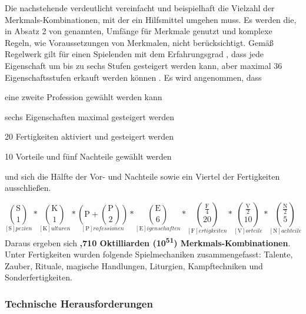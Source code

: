 Die nachstehende  verdeutlicht vereinfacht und beispielhaft die Vielzahl der Merkmals-Kombinationen, mit der ein Hilfsmittel umgehen muss.
Es werden die, in Absatz 2 von  genannten, Umfänge für Merkmale genutzt und komplexe Regeln, wie \zB Voraussetzungen von Merkmalen, nicht berücksichtigt.
Gemäß Regelwerk gilt für einen Spielenden mit dem Erfahrungsgrad , dass jede Eigenschaft um bis zu sechs Stufen gesteigert werden kann, aber maximal 36 Eigenschaftsstufen erkauft werden können .
Es wird angenommen, dass
\begin{itemize*}[label={}, itemjoin={,}]
    \item eine zweite Profession gewählt werden kann
    \item sechs Eigenschaften maximal gesteigert werden
    \item 20 Fertigkeiten aktiviert und gesteigert werden
    \item 10 Vorteile und fünf Nachteile gewählt werden
    \item und sich die Hälfte der Vor- und Nachteile sowie ein Viertel der Fertigkeiten ausschließen.
\end{itemize*}
\begin{equation}
    \label{eq:merkmals-kombinationen}
    \underset{[\textrm{S}]pezien}{
        \binom{\textrm{S}}{1}
    } *
    \underset{[\textrm{K}]ulturen}{
        \binom{\textrm{K}}{1}
    } *
    \underset{[\textrm{P}]rofessionen}{
        \left( \textrm{P} + \binom{\textrm{P}}{2} \right)
    } *
    \underset{[\textrm{E}]igenschaften}{
        \binom{\textrm{E}}{6}
    } *
    \underset{[\textrm{F}]ertigkeiten}{
        \binom{\frac{\textrm{F}}{4}}{20}
    } *
    \underset{[\textrm{V}]orteile}{
        \binom{\frac{\textrm{V}}{2}}{10}
    } *
    \underset{[\textrm{N}]achteile}{
        \binom{\frac{\textrm{N}}{2}}{5}
    }
\end{equation}
Daraus ergeben sich \textbf{,710 Oktilliarden (10\textsuperscript{51}) Merkmals-Kombinationen}.
Unter Fertigkeiten wurden folgende Spielmechaniken zusammengefasst: Talente, Zauber, Rituale, magische Handlungen, Liturgien, Kampftechniken und Sonderfertigkeiten.


\subsubsection{Technische Herausforderungen}
\label{subsubsec:technische-herausforderungen}

